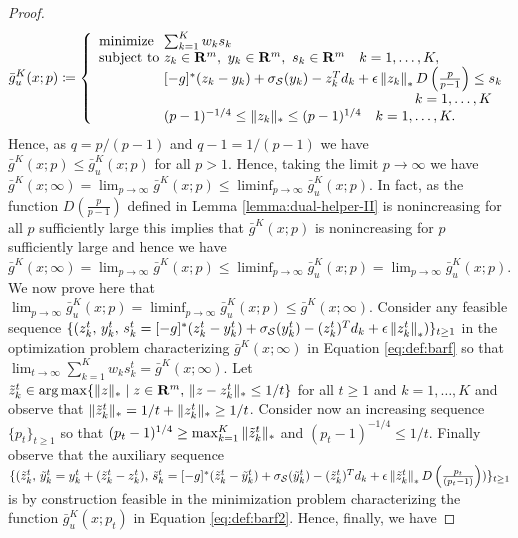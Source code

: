 \documentclass[12pt]{article}
\theoremstyle{thmstyleone}%
\theoremstyle{thmstyletwo}%
\theoremstyle{thmstylethree}%
\newcommand{\reviewChanges}{}
\begin{document}
\begin{appendices}
\begin{proof}
  \begin{equation}
    \label{eq:def:barf2}
    \bar g_u^K(x;p)\defn \left\{
      \begin{array}{l@{~}l}
        \mbox{minimize} & \sum_{k=1}^K w_k s_k\\
        \mbox{subject to} &  z_{k}\in \Re^m, ~y_{k}\in \Re^m, ~s_k\in \Re^m \quad k =1,\dots, K,\\
             &  [-g]^*(z_{k} - y_{k}) + \sigma_{\supp}(y_{k}) - z_{k}^T{d}_k  +\epsilon \left\|z_{k} \right\|_* D\left(\frac{p}{p-1}\right) \le s_k\\
						 &\hspace{6cm} \quad k =1,\dots, K\\
             & (p-1)^{-1/4} \leq \norm{z_k}_* \leq (p-1)^{1/4}\quad  k =1,\dots, K.
      \end{array}
    \right.
  \end{equation}
  Hence, as $q=p/(p-1)$ and $q-1=1/(p-1)$  we have
  \(
    \bar g^K(x;p) \leq \bar g_u^K(x;p)
  \)
  for all $p>1$.
  Hence, taking the limit $p\to\infty$ we have $\bar g^K(x;\infty)=\lim_{p\to\infty} \bar g^K(x;p) \leq \liminf_{p\to\infty} \bar g_u^K(x;p)$.
  \reviewChanges{In fact, as the function $D\left(\frac{p}{p-1}\right)$ defined in Lemma \ref{lemma:dual-helper-II} is nonincreasing for all $p$ sufficiently large this implies that $\bar g^K(x;p)$ is nonincreasing for $p$ sufficiently large and hence we have $\bar g^K(x;\infty)=\lim_{p\to\infty} \bar g^K(x;p) \leq \liminf_{p\to\infty} \bar g_u^K(x;p) = \lim_{p\to\infty} \bar g_u^K(x;p)$. }
    We now prove here that $\lim_{p\to\infty} \bar g_u^K(x;p) = \liminf_{p\to\infty} \bar g_u^K(x;p)\leq \bar g^K(x;\infty)$. \reviewChanges{Consider any feasible sequence $\{(z^t_{k}, \,y^t_{k}, \,s^t_k=[-g]^*(z^t_{k} - y^t_{k}) + \sigma_{\mathcal{S}}(y^t_{k}) - (z^t_{k})^T{d}_k  +\epsilon \left\|z^t_{k} \right\|_* )\}_{t\geq 1}$ in the optimization problem characterizing $\bar g^K(x;\infty)$ in Equation \eqref{eq:def:barf} so that $\lim_{t\to\infty}\sum_{k=1}^K w_k s^t_k=\bar g^K(x;\infty)$.}
  Let $\tilde z^t_{k}\in \arg\max \{ \| z \|_* \mid z\in {\mathbf R}^m, \, \| z-z_k^t \|_*\leq 1/t \}$ for all $t\geq 1$ and $k=1,\dots, K$ and \reviewChanges{observe that $\| \tilde z^t_k \|_*= 1/t+\| z_k^t \|_*\geq 1/t$.}
  Consider now an increasing sequence $\{p_t\}_{t\geq 1}$ so that $(p_t-1)^{1/4}\geq \max^K_{k=1} \| \tilde z^t_k \|_*$ and $(p_t-1)^{-1/4}\leq 1/t$.
  Finally observe that the auxiliary sequence $\{(\tilde z^t_{k}, \,\tilde y^t_{k}=y^t_k + (\tilde z^t_{k}-z^t_{k}), \,\tilde s^t_k= [-g]^*(\tilde z^t_{k} - \tilde y^t_{k}) + \sigma_{\mathcal{S}}(\tilde y^t_{k}) - (\tilde z^t_{k})^T{d}_k  +\epsilon \left\|\tilde z^t_{k} \right\|_* D\left(\tfrac{p_t}{(p_t-1)}\right))\}_{t\geq 1}$ is by construction feasible in the minimization problem characterizing the function $\bar g_u^K(x;p_t)$ in Equation \eqref{eq:def:barf2}. Hence, finally, we have

\end{proof}
\end{appendices}
\end{document}
